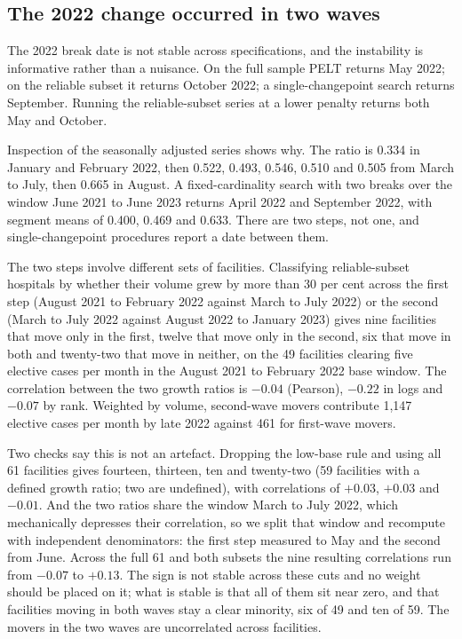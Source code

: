 \subsection{The 2022 change occurred in two waves}

The 2022 break date is not stable across specifications, and the instability is
informative rather than a nuisance. On the full sample PELT returns May 2022;
on the reliable subset it returns October 2022; a single-changepoint search
returns September. Running the reliable-subset series at a lower penalty
returns both May and October.

Inspection of the seasonally adjusted series shows why. The ratio is 0.334 in
January and February 2022, then 0.522, 0.493, 0.546, 0.510 and 0.505 from March
to July, then 0.665 in August. A fixed-cardinality search with two breaks over
the window June 2021 to June 2023 returns April 2022 and September 2022, with
segment means of 0.400, 0.469 and 0.633. There are two steps, not one, and
single-changepoint procedures report a date between them.

The two steps involve different sets of facilities. Classifying reliable-subset
hospitals by whether their volume grew by more than 30 per cent across the
first step (August 2021 to February 2022 against March to July 2022) or the
second (March to July 2022 against August 2022 to January 2023) gives nine
facilities that move only in the first, twelve that move only in the second,
six that move in both and twenty-two that move in neither, on the 49 facilities
clearing five elective cases per month in the August 2021 to February 2022 base
window. The correlation between the two growth ratios is $-0.04$ (Pearson),
$-0.22$ in logs and $-0.07$ by rank. Weighted by volume, second-wave movers
contribute 1{,}147 elective cases per month by late 2022 against 461 for
first-wave movers.

Two checks say this is not an artefact. Dropping the low-base rule and using all
61 facilities gives fourteen, thirteen, ten and twenty-two (59 facilities with a defined growth ratio; two are undefined), with correlations of
$+0.03$, $+0.03$ and $-0.01$. And the two ratios share the window March to July
2022, which mechanically depresses their correlation, so we split that window and
recompute with independent denominators: the first step measured to May and the
second from June. Across the full 61 and both subsets the nine resulting
correlations run from $-0.07$ to $+0.13$. The sign is not stable across these
cuts and no weight should be placed on it; what is stable is that all of them sit
near zero, and that facilities moving in both waves stay a clear minority, six of
49 and ten of 59. The movers in the two waves are uncorrelated across facilities.

